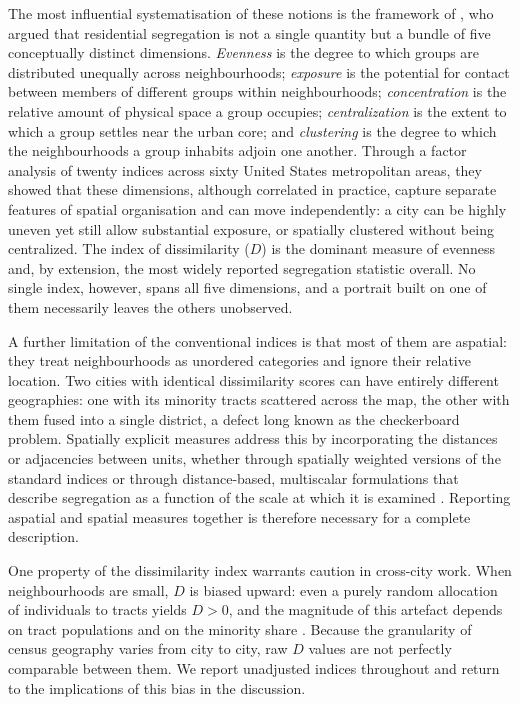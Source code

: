 \documentclass[12pt,a4paper]{article}
\begin{document}
The most influential systematisation of these notions is the framework of \citet{massey1988dimensions}, who argued that residential segregation is not a single quantity but a bundle of five conceptually distinct dimensions. \emph{Evenness} is the degree to which groups are distributed unequally across neighbourhoods; \emph{exposure} is the potential for contact between members of different groups within neighbourhoods; \emph{concentration} is the relative amount of physical space a group occupies; \emph{centralization} is the extent to which a group settles near the urban core; and \emph{clustering} is the degree to which the neighbourhoods a group inhabits adjoin one another. Through a factor analysis of twenty indices across sixty United States metropolitan areas, they showed that these dimensions, although correlated in practice, capture separate features of spatial organisation and can move independently: a city can be highly uneven yet still allow substantial exposure, or spatially clustered without being centralized. The index of dissimilarity ($D$) is the dominant measure of evenness and, by extension, the most widely reported segregation statistic overall. No single index, however, spans all five dimensions, and a portrait built on one of them necessarily leaves the others unobserved.

A further limitation of the conventional indices is that most of them are aspatial: they treat neighbourhoods as unordered categories and ignore their relative location. Two cities with identical dissimilarity scores can have entirely different geographies: one with its minority tracts scattered across the map, the other with them fused into a single district, a defect long known as the checkerboard problem. Spatially explicit measures address this by incorporating the distances or adjacencies between units, whether through spatially weighted versions of the standard indices \citep{wong1993spatial, morgan1983distance} or through distance-based, multiscalar formulations that describe segregation as a function of the scale at which it is examined \citep{reardon2002measures}. Reporting aspatial and spatial measures together is therefore necessary for a complete description.

One property of the dissimilarity index warrants caution in cross-city work. When neighbourhoods are small, $D$ is biased upward: even a purely random allocation of individuals to tracts yields $D > 0$, and the magnitude of this artefact depends on tract populations and on the minority share \citep{cortese1976further, carrington1997measuring, allen2015more}. Because the granularity of census geography varies from city to city, raw $D$ values are not perfectly comparable between them. We report unadjusted indices throughout and return to the implications of this bias in the discussion.
\end{document}
